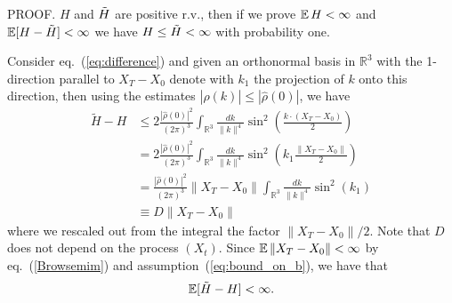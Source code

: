 
PROOF. $H$ and $\Tilde{H}$ are positive r.v., then  
if we prove 
$ \operatorname{{\mathbb E}} H < \infty$ and $\operatorname{{\mathbb E}} [H - \Tilde{H}] < \infty$ we have
$H \le \Tilde{H} <\infty$ with probability one. 

Consider eq.~(\ref{eq:difference}) and 
given an orthonormal basis in $\mathbb{R}^3$ with the
1-direction parallel to $X_T - X_0$ denote with $k_1$ the
projection of $k$ onto this direction, then  using  the
estimates $|\hat{\rho}(k)| \le |\hat{\rho}(0)|$, we have
\begin{equation}
\begin{split}
\tilde{H} - H & \le 2 \frac{|\hat{\rho}(0)|^2}{(2\pi)^3}
 \int_{\mathbb{R}^3} \frac{dk}{\|k\|^4}
\sin^2\left(\frac{k \cdot (X_T-X_0)}{2}\right)
\\ & = 2 \frac{|\hat{\rho}(0)|^2}{(2\pi)^3}
 \int_{\mathbb{R}^3}  \frac{  dk}{\|k\|^4} 
\sin^2\left( k_1 \frac{\|X_T-X_0\|}{2} \right) 
\\ & =  \frac{|\hat{\rho}(0)|^2}{(2\pi)^3} \|X_T-X_0\| 
 \int_{\mathbb{R}^3}  \frac{  dk}{\|k\|^4} 
\sin^2\left( k_1 \right)  \\ & \equiv D \|X_T-X_0\|
\end{split}
\label{eq:extraction_in_difference}
\end{equation}
where we rescaled out from the integral the factor $\|X_T - X_0\|/2$. 
Note that $D$ does not depend on the process $(X_t)$.
Since  $\operatorname{{\mathbb E}} \|X_T-X_0\| < \infty$ by
eq.~(\ref{Browsemim}) and  assumption~(\ref{eq:bound_on_b}), we have
that
$$
\operatorname{{\mathbb E}} [\tilde{H} - H] < \infty.
$$
  

